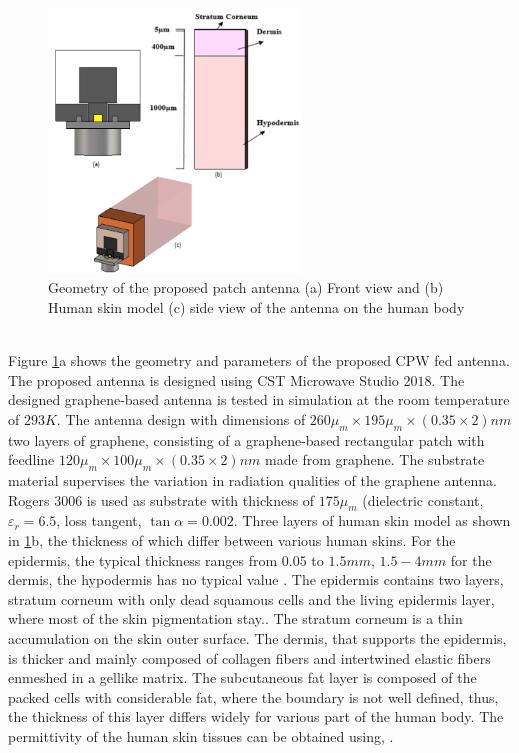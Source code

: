 \documentclass[12pt]{suhbook}
\begin{document}
\begin{figure}[hbt!]
\centering
\includegraphics[width=0.6\textwidth]{8}
\caption{Geometry of the proposed patch antenna (a) Front view and (b) Human skin model (c) side view of the antenna on the human body}
\label{Fig 8}
\end{figure}
\\Figure \ref{Fig 8}a shows the geometry and parameters of the proposed CPW fed antenna. The proposed antenna is designed using CST Microwave Studio $2018$. The designed graphene-based antenna is tested in simulation at the room temperature of $293 K$. The antenna design with dimensions of $260 \mu_m \times 195\mu_m \times (0.35\times2)nm$ two layers of graphene, consisting of a graphene-based rectangular patch with feedline $120\mu_m \times 100\mu_m \times (0.35\times 2)nm$ made from graphene. The substrate material supervises the variation in radiation qualities of the graphene antenna. Rogers $3006$ is used as substrate with thickness of $175 \mu_m$ (dielectric constant,$\varepsilon_r = 6.5$, loss tangent, $\tan {\alpha} = 0.002$. Three layers of human skin model as shown in \ref{Fig 8}b, the thickness of which differ between various human skins. For the epidermis, the typical thickness ranges from $0.05$ to $1.5 mm$, $1.5-4 mm$ for the dermis, the hypodermis has no typical value \cite{dashti2018graphene}. The epidermis contains two layers, stratum corneum with only dead squamous cells and the living epidermis layer, where most of the skin pigmentation stay.\cite{abadal2015time}. The stratum corneum is a thin accumulation on the skin outer surface. The dermis, that supports the epidermis, is thicker and mainly composed of collagen fibers and intertwined elastic fibers enmeshed in a gellike matrix. The subcutaneous fat layer is composed of the packed cells with considerable fat, where the boundary is not well defined, thus, the thickness of this layer differs widely for various part of the human body. The permittivity of the human skin tissues can be obtained using,\cite{berry2003optical} \cite{yang2015numerical}.
\end{document}
